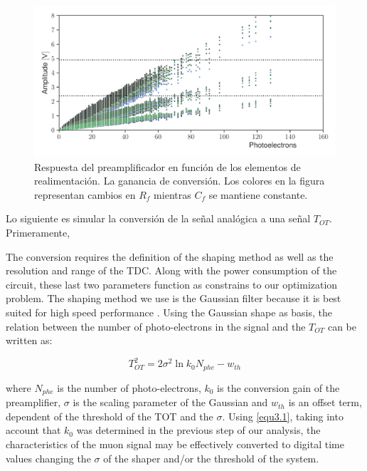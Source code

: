 \begin{figure}
        \centering
        \includegraphics[width=\textwidth]{phe-cal.pdf}
        \caption{Respuesta del preamplificador en función de los elementos de realimentación. La ganancia de conversión. Los colores en la figura representan cambios en $R_{f}$ mientras $C_{f}$ se mantiene constante.}
        \label{fig:phe-cal}
\end{figure}

Lo siguiente es simular la conversión de la señal analógica a una señal $T_{OT}$. Primeramente,


 The conversion requires the definition of the shaping method as well as the resolution and range of the TDC. Along with the power consumption of the circuit, these last two parameters function as constrains to our optimization problem. The shaping method we use is the Gaussian filter because it is best suited for high speed performance \cite{ohkawa76}. Using the Gaussian shape as basis, the relation between the number of photo-electrons in the signal and the $T_{OT}$ can be written as:

\begin{equation}
\label{equ3.1}
T_{OT}^{2}=2\sigma^{2}\ln{k_{0} N_{phe}}-w_{th}
\end{equation}

where $N_{phe}$ is the number of photo-electrons, $k_{0}$ is the conversion gain of the preamplifier, $\sigma$ is the scaling parameter of the Gaussian and $w_{th}$ is an offset term, dependent of the threshold of the TOT and the $\sigma$. Using \ref{equ3.1}, taking into account that $k_{0}$ was determined in the previous step of our analysis, the characteristics of the muon signal may be effectively converted to digital time values changing the $\sigma$ of the shaper and/or the threshold of the system.

